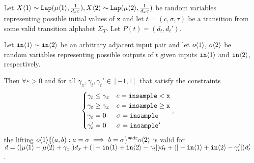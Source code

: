 \begin{lemma}\label{indTransitionCoupling}
    Let $X\brangle{1}\sim \Lap(\mu\brangle{1}, \frac{1}{d_x\varepsilon}), X\brangle{2}\sim\Lap(\mu\brangle{2}, \frac{1}{d_x\varepsilon})$ be random variables representing possible initial values of $\texttt{x}$ and let $t = (c, \sigma, \tau)$ be a transition from some valid transition alphabet $\Sigma_T$.
    Let $P(t) = (d_t, d_t')$.

    Let $\texttt{in}\brangle{1}\sim \texttt{in}\brangle{2}$ be an arbitrary adjacent input pair and let $o\brangle{1}$, $o\brangle{2}$ be random variables representing possible outputs of $t$ given inputs $\texttt{in}\brangle{1}$ and $\texttt{in}\brangle{2}$, respectively. 

    Then $\forall \varepsilon>0$ and for all $\gamma_x, \gamma_t, \gamma_t'\in [-1, 1]$ that satisfy the constraints \[
        \begin{cases}
          \gamma_t\leq\gamma_x & c = \lguard[\texttt{x}]\\
          \gamma_t\geq\gamma_x & c = \gguard[\texttt{x}]\\
          \gamma_t=0 & \sigma = \texttt{insample}\\
          \gamma_t'=0 & \sigma = \texttt{insample}'
        \end{cases},
      \]
      the lifting $o\brangle{1}\{(a, b): a=\sigma\implies b=\sigma\}^{\#d\varepsilon}o\brangle{2}$ is valid for $d = (|\mu\brangle{1}-\mu\brangle{2}+\gamma_x|)d_x+(|-\texttt{in}\brangle{1}+\texttt{in}\brangle{2}-\gamma_t|)d_t+(|-\texttt{in}\brangle{1}+\texttt{in}\brangle{2}-\gamma_t'|)d_t'$.
\end{lemma}

